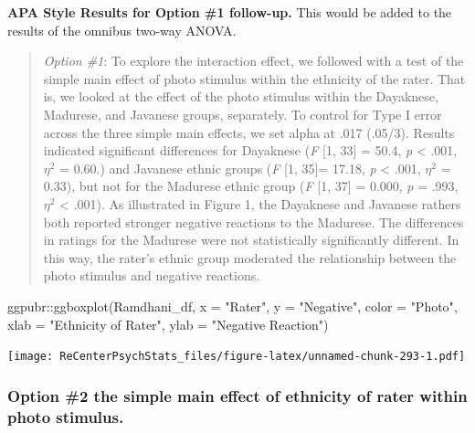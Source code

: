 \documentclass[
  11pt,
]{book}
\newenvironment{Shaded}{\begin{snugshade}}{\end{snugshade}}
\newcommand{\AttributeTok}[1]{\textcolor[rgb]{0.77,0.63,0.00}{#1}}
\newcommand{\FunctionTok}[1]{\textcolor[rgb]{0.00,0.00,0.00}{#1}}
\newcommand{\NormalTok}[1]{#1}
\newcommand{\SpecialCharTok}[1]{\textcolor[rgb]{0.00,0.00,0.00}{#1}}
\newcommand{\StringTok}[1]{\textcolor[rgb]{0.31,0.60,0.02}{#1}}
\begin{document}
\textbf{APA Style Results for Option \#1 follow-up.} This would be added to the results of the omnibus two-way ANOVA.

\begin{quote}
\emph{Option \#1}: To explore the interaction effect, we followed with a test of the simple main effect of photo stimulus within the ethnicity of the rater. That is, we looked at the effect of the photo stimulus within the Dayaknese, Madurese, and Javanese groups, separately. To control for Type I error across the three simple main effects, we set alpha at .017 (.05/3). Results indicated significant differences for Dayaknese (\emph{F} {[}1, 33{]} = 50.4, \emph{p} \textless{} .001, \(\eta ^{2}\) = 0.60.) and Javanese ethnic groups (\emph{F} {[}1, 35{]}= 17.18, \emph{p} \textless{} .001, \(\eta ^{2}\) = 0.33), but not for the Madurese ethnic group (\emph{F} {[}1, 37{]} = 0.000, \emph{p} = .993, \(\eta ^{2}\) \textless{} .001). As illustrated in Figure 1, the Dayaknese and Javanese rathers both reported stronger negative reactions to the Madurese. The differences in ratings for the Madurese were not statistically significantly different. In this way, the rater's ethnic group moderated the relationship between the photo stimulus and negative reactions.
\end{quote}

\begin{Shaded}
\begin{Highlighting}[]
\NormalTok{ggpubr}\SpecialCharTok{::}\FunctionTok{ggboxplot}\NormalTok{(Ramdhani\_df, }\AttributeTok{x =} \StringTok{"Rater"}\NormalTok{, }\AttributeTok{y =} \StringTok{"Negative"}\NormalTok{, }\AttributeTok{color =} \StringTok{"Photo"}\NormalTok{,}
    \AttributeTok{xlab =} \StringTok{"Ethnicity of Rater"}\NormalTok{, }\AttributeTok{ylab =} \StringTok{"Negative Reaction"}\NormalTok{)}
\end{Highlighting}
\end{Shaded}

\texttt{[image: ReCenterPsychStats\_files/figure-latex/unnamed-chunk-293-1.pdf]}

\hypertarget{option-2-the-simple-main-effect-of-ethnicity-of-rater-within-photo-stimulus.}{%
\subsubsection{Option \#2 the simple main effect of ethnicity of rater within photo stimulus.}\label{option-2-the-simple-main-effect-of-ethnicity-of-rater-within-photo-stimulus.}}
\end{document}
